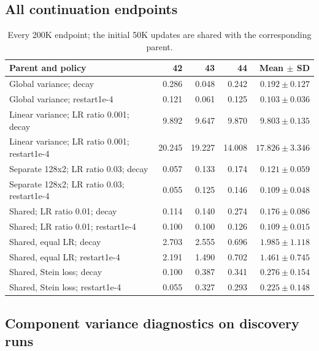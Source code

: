 \documentclass[11pt,a4paper]{article}
\begin{document}
\subsection{All continuation endpoints}
\begin{table}[H]\centering\small
\caption{Every 200K endpoint; the initial 50K updates are shared with the corresponding parent.}
\begin{tabular}{@{}>{\raggedright\arraybackslash}p{7cm}rrrr@{}}
\toprule
Parent and policy & 42 & 43 & 44 & Mean $\pm$ SD \\ \midrule
Global variance; decay & 0.286 & 0.048 & 0.242 & $0.192\pm0.127$ \\
Global variance; restart1e-4 & 0.121 & 0.061 & 0.125 & $0.103\pm0.036$ \\
Linear variance; LR ratio 0.001; decay & 9.892 & 9.647 & 9.870 & $9.803\pm0.135$ \\
Linear variance; LR ratio 0.001; restart1e-4 & 20.245 & 19.227 & 14.008 & $17.826\pm3.346$ \\
Separate 128x2; LR ratio 0.03; decay & 0.057 & 0.133 & 0.174 & $0.121\pm0.059$ \\
Separate 128x2; LR ratio 0.03; restart1e-4 & 0.055 & 0.125 & 0.146 & $0.109\pm0.048$ \\
Shared; LR ratio 0.01; decay & 0.114 & 0.140 & 0.274 & $0.176\pm0.086$ \\
Shared; LR ratio 0.01; restart1e-4 & 0.100 & 0.100 & 0.126 & $0.109\pm0.015$ \\
Shared, equal LR; decay & 2.703 & 2.555 & 0.696 & $1.985\pm1.118$ \\
Shared, equal LR; restart1e-4 & 2.191 & 1.490 & 0.702 & $1.461\pm0.745$ \\
Shared, Stein loss; decay & 0.100 & 0.387 & 0.341 & $0.276\pm0.154$ \\
Shared, Stein loss; restart1e-4 & 0.055 & 0.327 & 0.293 & $0.225\pm0.148$ \\
\bottomrule\end{tabular}\end{table}
\clearpage\subsection{Component variance diagnostics on discovery runs}
\end{document}
